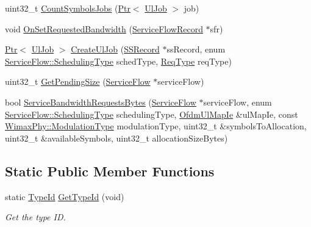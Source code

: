 \begin{DoxyCompactItemize}
\item 
uint32\+\_\+t \hyperlink{classns3_1_1UplinkSchedulerMBQoS_a8b187198e3609de02b2179629485a6fa}{Count\+Symbols\+Jobs} (\hyperlink{classns3_1_1Ptr}{Ptr}$<$ \hyperlink{classns3_1_1UlJob}{Ul\+Job} $>$ job)
\item 
void \hyperlink{classns3_1_1UplinkSchedulerMBQoS_ae3d25dea784092d453a60cb97364ac57}{On\+Set\+Requested\+Bandwidth} (\hyperlink{classns3_1_1ServiceFlowRecord}{Service\+Flow\+Record} $\ast$sfr)
\item 
\hyperlink{classns3_1_1Ptr}{Ptr}$<$ \hyperlink{classns3_1_1UlJob}{Ul\+Job} $>$ \hyperlink{classns3_1_1UplinkSchedulerMBQoS_a09c9fce5d8872eaf5cdf60209a556e21}{Create\+Ul\+Job} (\hyperlink{classns3_1_1SSRecord}{S\+S\+Record} $\ast$ss\+Record, enum \hyperlink{classns3_1_1ServiceFlow_a7990ba10be1e098328fd1e6382a26235}{Service\+Flow\+::\+Scheduling\+Type} sched\+Type, \hyperlink{namespacens3_a534f9a14e4d9aeb5b400e61f152a73a2}{Req\+Type} req\+Type)
\item 
uint32\+\_\+t \hyperlink{classns3_1_1UplinkSchedulerMBQoS_acd81dfb3cabd98ee2f244df25e14558c}{Get\+Pending\+Size} (\hyperlink{classns3_1_1ServiceFlow}{Service\+Flow} $\ast$service\+Flow)
\item 
bool \hyperlink{classns3_1_1UplinkSchedulerMBQoS_a9880f5e1bce7b93ddff11623f29d4865}{Service\+Bandwidth\+Requests\+Bytes} (\hyperlink{classns3_1_1ServiceFlow}{Service\+Flow} $\ast$service\+Flow, enum \hyperlink{classns3_1_1ServiceFlow_a7990ba10be1e098328fd1e6382a26235}{Service\+Flow\+::\+Scheduling\+Type} scheduling\+Type, \hyperlink{classns3_1_1OfdmUlMapIe}{Ofdm\+Ul\+Map\+Ie} \&ul\+Map\+Ie, const \hyperlink{classns3_1_1WimaxPhy_a044c5d8a48ca992c39c2a946f6e755fa}{Wimax\+Phy\+::\+Modulation\+Type} modulation\+Type, uint32\+\_\+t \&symbols\+To\+Allocation, uint32\+\_\+t \&available\+Symbols, uint32\+\_\+t allocation\+Size\+Bytes)
\end{DoxyCompactItemize}
\subsection*{Static Public Member Functions}
\begin{DoxyCompactItemize}
\item 
static \hyperlink{classns3_1_1TypeId}{Type\+Id} \hyperlink{classns3_1_1UplinkSchedulerMBQoS_a4c634147cc54a03736648d6f128826d6}{Get\+Type\+Id} (void)
\begin{DoxyCompactList}\small\item\em Get the type ID. \end{DoxyCompactList}\end{DoxyCompactItemize}
